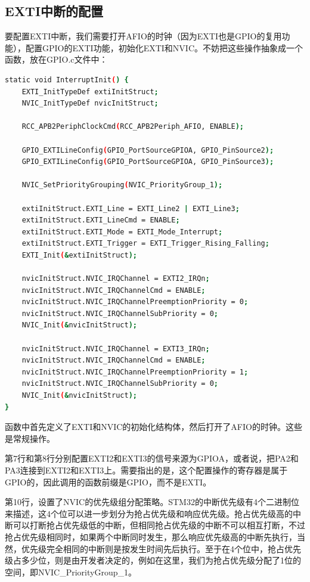 	\subsection{EXTI中断的配置}
		要配置EXTI中断，我们需要打开AFIO的时钟（因为EXTI也是GPIO的复用功能），配置GPIO的EXTI功能，初始化EXTI和NVIC。不妨把这些操作抽象成一个函数，放在GPIO.c文件中：
		\par 
		\begin{lstlisting}[language=bash, style=customStyleC, caption=EXTI配置]
static void InterruptInit() {
	EXTI_InitTypeDef extiInitStruct;
	NVIC_InitTypeDef nvicInitStruct;
	
	RCC_APB2PeriphClockCmd(RCC_APB2Periph_AFIO, ENABLE);
	
	GPIO_EXTILineConfig(GPIO_PortSourceGPIOA, GPIO_PinSource2);
	GPIO_EXTILineConfig(GPIO_PortSourceGPIOA, GPIO_PinSource3);
	
	NVIC_SetPriorityGrouping(NVIC_PriorityGroup_1);
	
	extiInitStruct.EXTI_Line = EXTI_Line2 | EXTI_Line3;
	extiInitStruct.EXTI_LineCmd = ENABLE;
	extiInitStruct.EXTI_Mode = EXTI_Mode_Interrupt;
	extiInitStruct.EXTI_Trigger = EXTI_Trigger_Rising_Falling;
	EXTI_Init(&extiInitStruct);
	
	nvicInitStruct.NVIC_IRQChannel = EXTI2_IRQn;
	nvicInitStruct.NVIC_IRQChannelCmd = ENABLE;
	nvicInitStruct.NVIC_IRQChannelPreemptionPriority = 0;
	nvicInitStruct.NVIC_IRQChannelSubPriority = 0;
	NVIC_Init(&nvicInitStruct);
	
	nvicInitStruct.NVIC_IRQChannel = EXTI3_IRQn;
	nvicInitStruct.NVIC_IRQChannelCmd = ENABLE;
	nvicInitStruct.NVIC_IRQChannelPreemptionPriority = 1;
	nvicInitStruct.NVIC_IRQChannelSubPriority = 0;
	NVIC_Init(&nvicInitStruct);
}
		\end{lstlisting}
		\par 
		函数中首先定义了EXTI和NVIC的初始化结构体，然后打开了AFIO的时钟。这些是常规操作。
		\par 
		第7行和第8行分别配置EXTI2和EXTI3的信号来源为GPIOA，或者说，把PA2和PA3连接到EXTI2和EXTI3上。需要指出的是，这个配置操作的寄存器是属于GPIO的，因此调用的函数前缀是GPIO，而不是EXTI。
		\par 
		第10行，设置了NVIC的优先级组分配策略。STM32的中断优先级有4个二进制位来描述，这4个位可以进一步划分为抢占优先级和响应优先级。抢占优先级高的中断可以打断抢占优先级低的中断，但相同抢占优先级的中断不可以相互打断，不过抢占优先级相同时，如果两个中断同时发生，那么响应优先级高的中断先执行，当然，优先级完全相同的中断则是按发生时间先后执行。至于在4个位中，抢占优先级占多少位，则是由开发者决定的，例如在这里，我们为抢占优先级分配了1位的空间，即NVIC\_PriorityGroup\_1。
